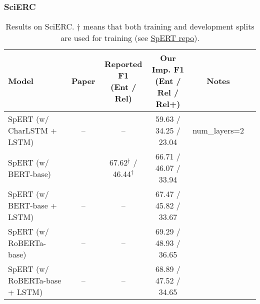 \documentclass{article}
\begin{document}
\subsubsection{SciERC}
\begin{table}[H]
    \centering
    \begin{tabular}{lccccc}
    \toprule
    Model & Paper & \makecell{Reported F1 \\(Ent / Rel)} & \makecell{Our Imp. F1 \\(Ent / Rel / Rel+)} & Notes \\
    \midrule
    SpERT (w/ CharLSTM + LSTM)     & --                     & --                & 59.63 / 34.25 / 23.04 & num\_layers=2 \\
    SpERT (w/ BERT-base)           & \citet{eberts2019span} & 67.62$^\dagger$ / 46.44$^\dagger$ & 66.71 / 46.07 / 33.94 \\
    SpERT (w/ BERT-base + LSTM)    & --                     & --                & 67.47 / 45.82 / 33.67 \\
    SpERT (w/ RoBERTa-base)        & --                     & --                & 69.29 / 48.93 / 36.65 \\
    SpERT (w/ RoBERTa-base + LSTM) & --                     & --                & 68.89 / 47.52 / 34.65 \\
    \bottomrule
    \end{tabular}
    \caption{Results on SciERC. $\dagger$ means that both training and development splits are used for training (see \href{https://github.com/lavis-nlp/spert/issues/2}{SpERT repo}).}
\end{table}


\newpage

 
\end{document}
